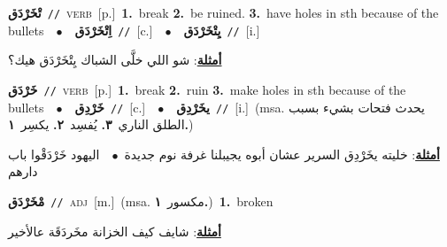 \documentclass[10pt,a4paper,twoside]{article} %
\begin{document}
\begin{multicols}{2}
{\setlength\topsep{0pt}\textbf{\foreignlanguage{arabic}{تْخَرْدَق}}\ {\color{gray}\texttt{//}\color{black}}\ \textsc{verb}\ [p.]\ \textbf{1.}~break  \textbf{2.}~be ruined.  \textbf{3.}~have holes in sth because of the bullets\ \ $\bullet$\ \ \setlength\topsep{0pt}\textbf{\foreignlanguage{arabic}{اِتْخَرْدَق}}\ {\color{gray}\texttt{//}\color{black}}\ [c.]\ \ $\bullet$\ \ \setlength\topsep{0pt}\textbf{\foreignlanguage{arabic}{يِتْخَرْدَق}}\ {\color{gray}\texttt{//}\color{black}}\ [i.]\  \begin{flushright}\color{gray}\foreignlanguage{arabic}{\textbf{\underline{\foreignlanguage{arabic}{أمثلة}}}: شو اللي خلَّى الشباك يِتْخَرْدَق هيك؟}\end{flushright}\color{black}} \vspace{2mm}

{\setlength\topsep{0pt}\textbf{\foreignlanguage{arabic}{خَرْدَق}}\ {\color{gray}\texttt{//}\color{black}}\ \textsc{verb}\ [p.]\ \textbf{1.}~break  \textbf{2.}~ruin  \textbf{3.}~make holes in sth because of the bullets\ \ $\bullet$\ \ \setlength\topsep{0pt}\textbf{\foreignlanguage{arabic}{خَرْدِق}}\ {\color{gray}\texttt{//}\color{black}}\ [c.]\ \ $\bullet$\ \ \setlength\topsep{0pt}\textbf{\foreignlanguage{arabic}{يخَرْدِق}}\ {\color{gray}\texttt{//}\color{black}}\ [i.]\ \color{gray}(msa. \foreignlanguage{arabic}{يحدث فتحات بشيء بسبب الطلق الناري}~\foreignlanguage{arabic}{\textbf{٣.}}  \foreignlanguage{arabic}{يُفسِد}~\foreignlanguage{arabic}{\textbf{٢.}}  \foreignlanguage{arabic}{يكسِر}~\foreignlanguage{arabic}{\textbf{١.}})\color{black}\  \begin{flushright}\color{gray}\foreignlanguage{arabic}{\textbf{\underline{\foreignlanguage{arabic}{أمثلة}}}: خليته يخَرْدِق السرير عشان أبوه يجيبلنا غرفة نوم جديدة\ $\bullet$\ \  اليهود خَرْدَقْوا باب دارهم}\end{flushright}\color{black}} \vspace{2mm}

{\setlength\topsep{0pt}\textbf{\foreignlanguage{arabic}{مْخَرْدَق}}\ {\color{gray}\texttt{//}\color{black}}\ \textsc{adj}\ [m.]\ \color{gray}(msa. \foreignlanguage{arabic}{مكسور}~\foreignlanguage{arabic}{\textbf{١.}})\color{black}\ \textbf{1.}~broken\  \begin{flushright}\color{gray}\foreignlanguage{arabic}{\textbf{\underline{\foreignlanguage{arabic}{أمثلة}}}: شايف كيف الخزانة مخَردَقَة عالأخير}\end{flushright}\color{black}} \vspace{2mm}


\end{multicols}
\end{document}
